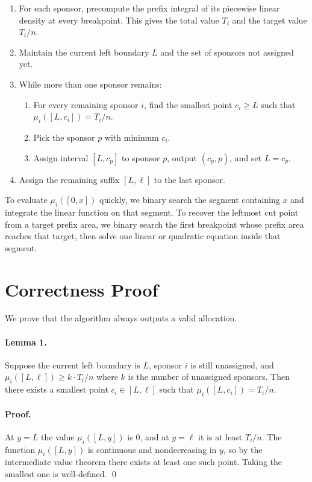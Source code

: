 \documentclass[11pt]{article}
\begin{document}
\begin{enumerate}[leftmargin=*]
    \item For each sponsor, precompute the prefix integral of its piecewise linear density at every breakpoint.
    This gives the total value $T_i$ and the target value $T_i / n$.
    \item Maintain the current left boundary $L$ and the set of sponsors not assigned yet.
    \item While more than one sponsor remains:
    \begin{enumerate}[leftmargin=*]
        \item For every remaining sponsor $i$, find the smallest point $c_i \ge L$ such that
        $\mu_i([L,c_i]) = T_i / n$.
        \item Pick the sponsor $p$ with minimum $c_i$.
        \item Assign interval $[L,c_p]$ to sponsor $p$, output $(c_p, p)$, and set $L = c_p$.
    \end{enumerate}
    \item Assign the remaining suffix $[L,\ell]$ to the last sponsor.
\end{enumerate}

To evaluate $\mu_i([0,x])$ quickly, we binary search the segment containing $x$ and integrate the linear
function on that segment. To recover the leftmost cut point from a target prefix area, we binary search the
first breakpoint whose prefix area reaches that target, then solve one linear or quadratic equation inside that
segment.

\section*{Correctness Proof}

We prove that the algorithm always outputs a valid allocation.

\paragraph{Lemma 1.}
Suppose the current left boundary is $L$, sponsor $i$ is still unassigned, and
$\mu_i([L,\ell]) \ge k \cdot T_i / n$ where $k$ is the number of unassigned sponsors. Then there exists a
smallest point $c_i \in [L,\ell]$ such that $\mu_i([L,c_i]) = T_i / n$.

\paragraph{Proof.}
At $y=L$ the value $\mu_i([L,y])$ is $0$, and at $y=\ell$ it is at least $T_i/n$. The function
$\mu_i([L,y])$ is continuous and nondecreasing in $y$, so by the intermediate value theorem there exists
at least one such point. Taking the smallest one is well-defined. \qed
\end{document}

